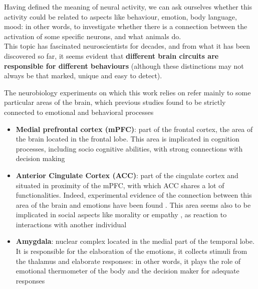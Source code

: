 \documentclass[12pt, a4paper]{report}
\begin{document}
	Having defined the meaning of neural activity, we can ask ourselves whether this activity could be related to aspects like behaviour, emotion, body language, mood: in other words, to investigate whether there is a connection between the activation of some specific neurons, and what animals do.\\
	This topic has fascinated neuroscientists for decades, and from what it has been discovered so far, it seems evident that \textbf{different brain circuits are responsible for different behaviours} (although these distinctions may not always be that marked, unique and easy to detect).

	
	The neurobiology experiments on which this work relies on refer mainly to some particular areas of the brain, which previous studies found to be strictly connected to emotional and behavioral processes \cite{2} %
	\begin{itemize}
		
		\item \textbf{Medial prefrontal cortex (mPFC)}:  part of the frontal cortex, the area of the brain located in the frontal lobe. This area is implicated in cognition processes, including socio cognitive abilities,  with strong connections with decision making \cite{3} %
		
		\item \textbf{Anterior Cingulate Cortex (ACC)}: part of the cingulate cortex and situated in proximity of the mPFC,  with which  ACC shares a lot of functionalities. Indeed, experimental evidence of the connection between this area of the brain and emotions have been found \cite{4}. %
		 This area seems also to be implicated in social aspects like morality or empathy \cite{5}, %
		  as reaction to interactions with another individual
		
		\item \textbf{Amygdala}: nuclear complex located in the medial part of the temporal lobe. It is responsible for the elaboration of the emotions, it collects stimuli from the thalamus and elaborate responses: in other words, it plays the role of emotional thermometer of the body and the decision maker for adequate responses \cite{6} %
	\end{itemize}
\end{document}
